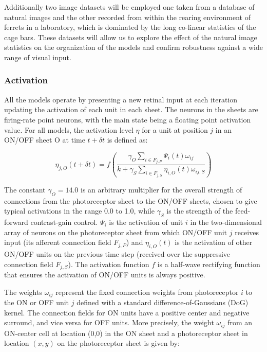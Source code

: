 Additionally two image datasets will be employed one taken from a
database of natural images and the other recorded from within the
rearing environment of ferrets in a laboratory, which is dominated by
the long co-linear statistics of the cage bars. These datasets will
allow us to explore the effect of the natural image statistics on the
organization of the models and confirm robustness against a wide range
of visual input.

\subsubsection{Activation}

All the models operate by presenting a new retinal input at each
iteration updating the activation of each unit in each sheet. The
neurons in the sheets are firing-rate point neurons, with the main
state being a floating point activation value.  For all models, the
activation level $\eta$ for a unit at position $j$ in an ON/OFF sheet
O at time $t+\delta t$ is defined as:

\begin{equation}
\eta_{j, O}(t+\delta t)=f\left(\frac{\gamma_{O}\sum_{i\in
    F_{j,P}}\Psi_{i}(t)\omega_{ij}}{k+\gamma_{S}\sum_{i\in
    F_{j,S}}\eta_{i, O}(t)\omega_{ij, S}}\right)
\label{eqn:lgnactivation}
\end{equation}

The constant $\gamma_{O}=14.0$ is an arbitrary multiplier for the
overall strength of connections from the photoreceptor sheet to the
ON/OFF sheets, chosen to give typical activations in the range 0.0 to
1.0, while $\gamma_{S}$ is the strength of the feed-forward
contrast-gain control. $\Psi_{i}$ is the activation of unit $i$ in the
two-dimensional array of neurons on the photoreceptor sheet from which
ON/OFF unit $j$ receives input (its afferent connection field
$F_{j,P}$) and $\eta_{i, O}(t)$ is the activation of other ON/OFF
units on the previous time step (received over the suppressive
connection field $F_{j,S}$). The activation function $f$ is a
half-wave rectifying function that ensures the activation of ON/OFF
units is always positive.

The weights $\omega_{ij}$ represent the fixed connection weights from
photoreceptor $i$ to the ON or OFF unit $j$ defined with a standard
difference-of-Gaussians (DoG) kernel. The connection fields for ON units
have a positive center and negative surround, and vice versa for OFF
units. More precisely, the weight $\omega_{ij}$ from an ON-center cell
at location (0,0) in the ON sheet and a photoreceptor sheet in
location $(x,y)$ on the photoreceptor sheet is given by:

